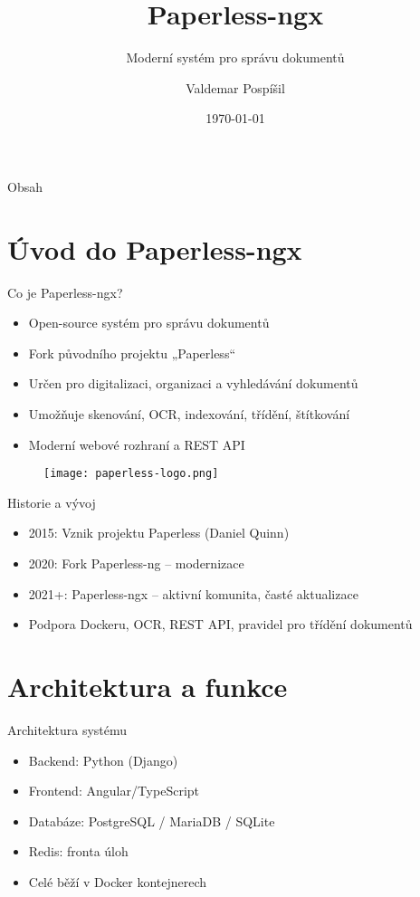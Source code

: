 \documentclass{beamer}
\title{Paperless-ngx}
\subtitle{Moderní systém pro správu dokumentů}
\author{Valdemar Pospíšil}
\institute{UJEP - PřF}
\date{\today}
\begin{document}
\begin{frame}
  \titlepage
\end{frame}

\begin{frame}{Obsah}
  \tableofcontents
\end{frame}

\section{Úvod do Paperless-ngx}

\begin{frame}{Co je Paperless-ngx?}
  \begin{itemize}
    \item Open-source systém pro správu dokumentů
    \item Fork původního projektu „Paperless“
    \item Určen pro digitalizaci, organizaci a vyhledávání dokumentů
    \item Umožňuje skenování, OCR, indexování, třídění, štítkování
    \item Moderní webové rozhraní a REST API
  \end{itemize}
  \begin{figure}
    \centering
    \texttt{[image: paperless-logo.png]}
  \end{figure}
\end{frame}

\begin{frame}{Historie a vývoj}
  \begin{itemize}
    \item 2015: Vznik projektu Paperless (Daniel Quinn)
    \item 2020: Fork Paperless-ng – modernizace
    \item 2021+: Paperless-ngx – aktivní komunita, časté aktualizace
    \item Podpora Dockeru, OCR, REST API, pravidel pro třídění dokumentů
  \end{itemize}
\end{frame}

\section{Architektura a funkce}

\begin{frame}{Architektura systému}
  \begin{itemize}
    \item Backend: Python (Django)
    \item Frontend: Angular/TypeScript
    \item Databáze: PostgreSQL / MariaDB / SQLite
    \item Redis: fronta úloh
    \item Celé běží v Docker kontejnerech
  \end{itemize}
\end{frame}
\end{document}
